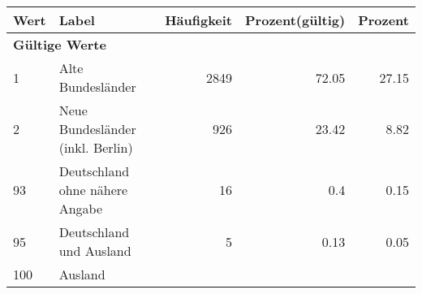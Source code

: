      \begin{longtable}{lXrrr}
     \toprule
     \textbf{Wert} & \textbf{Label} & \textbf{Häufigkeit} & \textbf{Prozent(gültig)} & \textbf{Prozent} \\
     \endhead
     \midrule
     \multicolumn{5}{l}{\textbf{Gültige Werte}}\\

     1 &
     \multicolumn{1}{X}{ Alte Bundesländer   } &


       \num{2849} &
       \num[round-mode=places,round-precision=2]{72.05} &
         \num[round-mode=places,round-precision=2]{27.15} \\

     2 &
     \multicolumn{1}{X}{ Neue Bundesländer (inkl. Berlin)   } &


       \num{926} &
       \num[round-mode=places,round-precision=2]{23.42} &
         \num[round-mode=places,round-precision=2]{8.82} \\

     93 &
     \multicolumn{1}{X}{ Deutschland ohne nähere Angabe   } &


       \num{16} &
       \num[round-mode=places,round-precision=2]{0.4} &
         \num[round-mode=places,round-precision=2]{0.15} \\

     95 &
     \multicolumn{1}{X}{ Deutschland und Ausland   } &


       \num{5} &
       \num[round-mode=places,round-precision=2]{0.13} &
         \num[round-mode=places,round-precision=2]{0.05} \\

     100 &
     \multicolumn{1}{X}{ Ausland   } &



\end{longtable}
